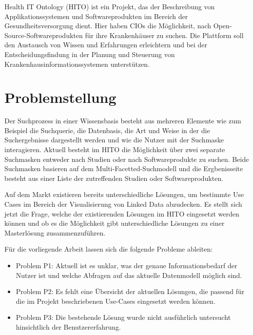 Health IT Ontology (HITO) ist ein Projekt, das der Beschreibung von Applikationssystemen und Softwareprodukten im Bereich der Gesundheitsversorgung dient. Hier haben CIOs die Möglichkeit, nach Open-Source-Softwareprodukten für ihre Krankenhäuser zu suchen. Die Plattform soll den Austausch von Wissen und Erfahrungen erleichtern und bei der Entscheidungsfindung in der Planung und Steuerung von Krankenhausinformationssystemen unterstützen.


\section{Problemstellung}\label{sec:problemstellung}

Der Suchprozess in einer Wissensbasis besteht aus mehreren Elemente wie zum Beispiel die Suchquerie, die Datenbasis, die Art und Weise in der die Suchergebnisse dargestellt werden und wie die Nutzer mit der Suchmaske interagieren.  Aktuell besteht im HITO die Möglichkeit über zwei separate Suchmasken entweder nach Studien oder nach Softwareprodukte zu suchen. Beide Suchmasken basieren auf dem Multi-Facetted-Suchmodell und die Ergbenisseite besteht aus einer Liste der zutreffenden Studien oder Softwareprodukten.

Auf dem Markt existieren bereits unterschiedliche Lösungen, um bestimmte Use Cases im Bereich der Visualisierung von Linked Data abzudecken. Es stellt sich jetzt die Frage, welche der existierenden Lösungen im HITO eingesetzt werden können und ob es die Möglichkeit gibt unterschiedliche Lösungen zu einer Masterlösung zusammenzuführen.

Für die vorliegende Arbeit lassen sich die folgende Probleme ableiten:

\begin{itemize}
\item Problem P1: Aktuell ist es unklar, was der genaue Informationsbedarf der Nutzer ist und welche Abfragen auf das aktuelle Datenmodell möglich sind.
\item Problem P2: Es fehlt eine Übersicht der aktuellen Lösungen, die passend für die im Projekt beschriebenen Use-Cases eingesetzt werden können.
\item Problem P3: Die bestehende Lösung wurde nicht ausführlich untersucht hinsichtlich der Benutzererfahrung.
\end{itemize}


